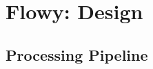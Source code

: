 \chapter{Flowy: Design}\label{ch:flowy-design}

\section{Processing Pipeline}\label{sec:processing-pipeline}